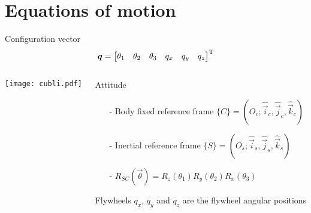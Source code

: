 \section{Equations of motion}
\begin{frame}{Configuration vector}
  \[  
  \boldsymbol{q} =
  \begin{bmatrix}
    \theta_{1} & \theta_{2} & \theta_{3} & q_{x} & q_{y} & q_{z}
  \end{bmatrix} ^{\mathrm{T}}
  \]
  \vskip-0.1in
  \begin{columns}
    \begin{column}{0.55\textwidth}
      \texttt{[image: cubli.pdf]}
    \end{column}
    \begin{column}{0.6\textwidth}
      \begin{block}{Attitude}
        \begin{itemize}
        \item[-] Body fixed reference frame $\{C\} = (O_c; \hat{\vec{i}}_c, \hat{\vec{j}}_c, \hat{\vec{k}}_c)$
        \item[-] Inertial reference frame $\{S\} = (O_s; \hat{\vec{i}}_s, \hat{\vec{j}}_s, \hat{\vec{k}}_s)$
        \item[-] $R_{SC}(\vec{\theta}) = R_z(\theta_1)R_y(\theta_2)R_x(\theta_3)$
        \end{itemize}
      \end{block}
      \begin{block}{Flywheels}
        $q_x$, $q_y$ and $q_z$ are the flywheel angular positions
      \end{block}
    \end{column}
  \end{columns}
\end{frame}

